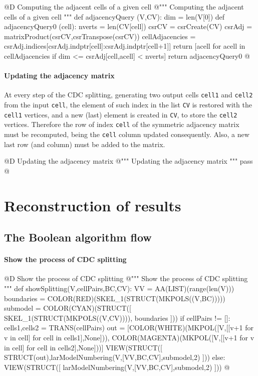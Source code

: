 \documentclass[11pt,oneside]{article}	%
\begin{document}
@D Computing the adjacent cells of a given cell
@{""" Computing the adjacent cells of a given cell """
def adjacencyQuery (V,CV):
	dim = len(V[0])
	def adjacencyQuery0 (cell):
		nverts = len(CV[cell])
		csrCV =  csrCreate(CV)
		csrAdj = matrixProduct(csrCV,csrTranspose(csrCV))
		cellAdjacencies = csrAdj.indices[csrAdj.indptr[cell]:csrAdj.indptr[cell+1]]
		return [acell for acell in cellAdjacencies if dim <= csrAdj[cell,acell] < nverts]
	return adjacencyQuery0
@}

\paragraph{Updating the adjacency matrix}
At every step of the CDC splitting, generating two output cells \texttt{cell1} and  \texttt{cell2} from the input  \texttt{cell}, the element of such index in the list \texttt{CV} is restored with the \texttt{cell1} vertices, and a new (last) element is created in \texttt{CV}, to store the \texttt{cell2} vertices.
Therefore the row of index \texttt{cell} of the symmetric  adjacency matrix must be recomputed, being the \texttt{cell} column updated consequently. Also, a new last row (and column) must be added to the matrix. 

@D Updating the adjacency matrix
@{""" Updating the adjacency matrix """
pass
@}


\section{Reconstruction of results}


\subsection{The Boolean algorithm flow}


\paragraph{Show the process of CDC splitting}

@D Show the process of CDC splitting
@{""" Show the process of CDC splitting """
def showSplitting(V,cellPairs,BC,CV):
	VV = AA(LIST)(range(len(V)))
	boundaries = COLOR(RED)(SKEL_1(STRUCT(MKPOLS((V,BC)))))
	submodel = COLOR(CYAN)(STRUCT([ SKEL_1(STRUCT(MKPOLS((V,CV)))), boundaries ]))
	if cellPairs != []:
		cells1,cells2 = TRANS(cellPairs)
		out = [COLOR(WHITE)(MKPOL([V,[[v+1 for v in cell] for cell in cells1],None])), 
				COLOR(MAGENTA)(MKPOL([V,[[v+1 for v in cell] for cell in cells2],None]))]
		VIEW(STRUCT([ STRUCT(out),larModelNumbering(V,[VV,BC,CV],submodel,2) ]))
	else:
		VIEW(STRUCT([ larModelNumbering(V,[VV,BC,CV],submodel,2) ]))
@}
\end{document}
